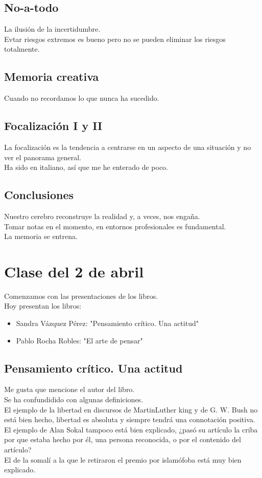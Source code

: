\documentclass[12pt, a4paper, twoside]{article}
\begin{document}
\subsection{No-a-todo}
La ilusión de la incertidumbre.\\

Evtar riesgos extremos es bueno pero no se pueden eliminar los riesgos totalmente.\\
\subsection{Memoria creativa}
Cuando no recordamos lo que nunca ha sucedido.\\

\subsection{Focalización I y II}
La focalización es la tendencia a centrarse en un aspecto de una situación y no ver el panorama general.\\
Ha sido en italiano, así que me he enterado de poco.\\

\subsection{Conclusiones}
Nuestro cerebro reconstruye la realidad y, a veces, nos engaña.\\
Tomar notas en el momento, en entornos profesionales es fundamental.\\
La memoria se entrena.\\

\section{Clase del 2 de abril}
Comenzamos con las presentaciones de los libros.\\

Hoy presentan los libros:
\begin{itemize}
    \item Sandra Vázquez Pérez: "Pensamiento crítico. Una actitud"
    \item Pablo Rocha Robles: "El arte de pensar"
\end{itemize}

\subsection{Pensamiento crítico. Una actitud}
Me gusta que mencione el autor del libro.\\
Se ha confundidido con algunas definiciones.\\
El ejemplo de la libertad en discursos de MartinLuther king y de G. W. Bush 
no está bien hecho, libertad es absoluta y siempre tendrá una connotación positiva.\\
El ejemplo de Alan Sokal tampoco está bien explicado, ¿pasó su artículo la criba por 
que estaba hecho por él, una persona reconocida, o por el contenido del artículo?\\
El de la somalí a la que le retiraron el premio por islamófoba está muy bien explicado.\\
\end{document}
